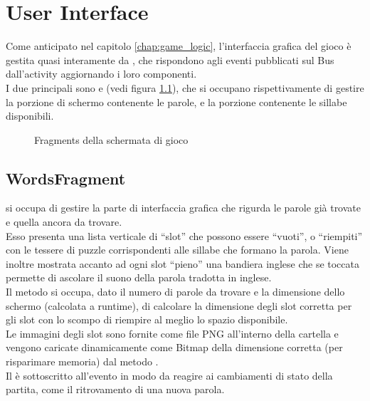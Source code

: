 


\chapter{User Interface}
\label{chap:ui}

Come anticipato nel capitolo \ref{chap:game_logic}, l'interfaccia grafica del gioco è gestita quasi interamente da , che rispondono agli eventi pubblicati sul Bus dall'activity  aggiornando i loro componenti.\\
I due principali  sono  e  (vedi figura \ref{fig:fragments}), che si occupano rispettivamente di gestire la porzione di schermo contenente le parole, e la porzione contenente le sillabe disponibili.

\begin{figure}[h!]
\label{fig:fragments}
  \centering
  \caption{Fragments della schermata di gioco}
\end{figure}


\section{WordsFragment}
\label{sec:words_fragment}
 si occupa di gestire la parte di interfaccia grafica che rigurda le parole già trovate e quella ancora da trovare.\\
Esso presenta una lista verticale di ``slot'' che possono essere ``vuoti'', o ``riempiti'' con le tessere di puzzle corrispondenti alle sillabe che formano la parola. Viene inoltre mostrata accanto ad ogni slot ``pieno'' una bandiera inglese che se toccata permette di ascolare il suono della parola tradotta in inglese.\\
Il metodo  si occupa, dato il numero di parole da trovare e la dimensione dello schermo (calcolata a runtime), di calcolare la dimensione degli slot corretta per gli slot con lo scompo di riempire al meglio lo spazio disponibile.\\
Le immagini degli slot sono fornite come file PNG all'interno della cartella  e vengono caricate dinamicamente come Bitmap della dimensione corretta (per risparimare memoria) dal metodo .\\
Il  è sottoscritto all'evento  in modo da reagire ai cambiamenti di stato della partita, come il ritrovamento di una nuova parola.

